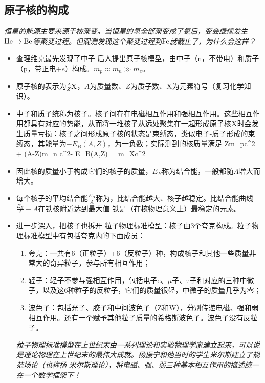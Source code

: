 \documentclass[a4paper,9pt]{ctexart}
\begin{document}
\subsection{原子核的构成}
\emph{恒星的能源主要来源于核聚变。当恒星的氢全部聚变成了氦后，变会继续发生${\rm He \to Be}$等聚变过程。但观测发现这个聚变过程到${\rm Fe}$就截止了，为什么会这样？}
\begin{itemize}
\item
查理维克最先发现了中子 \so 后人提出原子核模型，由中子（n，不带电）和质子（p，带正电$+e$）构成。$m_p \approx m_n \gg m_e$。
\item
原子核的表示为$^A_Z{\rm X}$，$A$为质量数、$Z$为质子数、${\rm X}$为元素符号（复习化学知识）。
\item
中子和质子统称为核子。核子间存在电磁相互作用和强相互作用。这些相互作用都具有对应的势能，从而将一堆核子从远处聚集在一起形成原子核${\rm X}$时会发生质量亏损：核子之间形成原子核的状态是束缚态，类似电子-质子形成的束缚态，其能量为$-E_B(A,Z)$，为一负数；实际测到的核质量满足
\beq
Zm_pc^2 + (A-Z)m_n c^2- E_B(A,Z) = m_{\rm X}c^2 
\eeq
\item
因此核的质量小于构成它们的核子的质量，$E_B$称为结合能，一般都随$A$增大而增大。
\item
每个核子的平均结合能$\frac{E_B}{A}$称为，比结合能越大、核子越稳定。比结合能曲线$\frac{E_B}{A} - A$在铁核附近达到最大值 \so 铁是（在核物理意义上）最稳定的元素。
\item
进一步深入，把核子也拆开 \so 粒子物理标准模型：核子由3个夸克构成。粒子物理标准模型中有包括夸克内的下面成员：
\begin{enumerate}
\item
夸克：一共有6（正粒子）+6（反粒子）种，构成核子和其他一些质量非常大的奇异粒子，参与所有相互作用；
\item
轻子：轻子不参与强相互作用，包括电子e、$\mu$子、$\tau$子和对应的三种中微子，以及这6种粒子的反粒子，它们的质量很轻，中微子的质量几乎为零；
\item
波色子：包括光子、胶子和中间波色子（Z和W），分别传递电磁、强和弱相互作用。还有一个赋予其他粒子质量的希格斯波色子。波色子没有反粒子。
\end{enumerate}
\emph{
粒子物理标准模型在上世纪末由一系列理论和实验物理学家建立起来，可以说是理论物理在上世纪末的最伟大成就。杨振宁和他当时的学生米尔斯建立了规范场论（也称杨-米尔斯理论），将电磁、强、弱三种基本相互作用的描述统一在一个数学框架下！}
\end{itemize}
\end{document}
